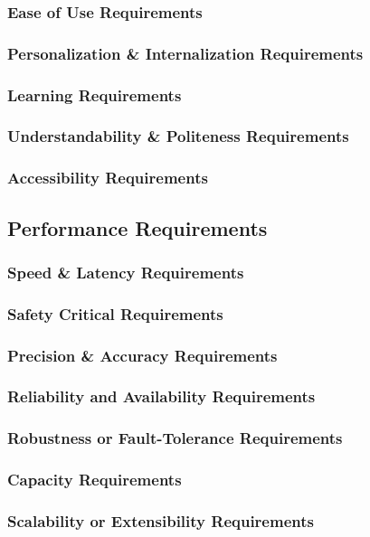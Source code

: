 \documentclass[titlepage]{article}
\begin{document}
\subsubsection{Ease of Use Requirements}
\subsubsection{Personalization \& Internalization Requirements}
\subsubsection{Learning Requirements}
\subsubsection{Understandability \& Politeness Requirements}
\subsubsection{Accessibility Requirements}

\subsection{Performance Requirements}
\subsubsection{Speed \& Latency Requirements}
\subsubsection{Safety Critical Requirements}
\subsubsection{Precision \& Accuracy Requirements}
\subsubsection{Reliability and Availability Requirements}
\subsubsection{Robustness or Fault-Tolerance Requirements}
\subsubsection{Capacity Requirements}
\subsubsection{Scalability or Extensibility Requirements}
\end{document}
